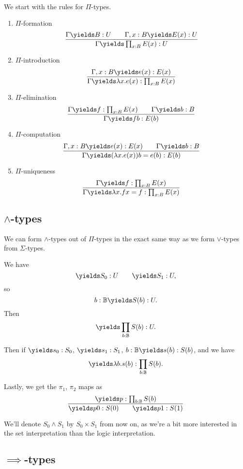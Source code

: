 \documentclass{article}
\newcommand\BB{\mathbb{B}}
\begin{document}
We start with the rules for $\Pi$-types.
\begin{enumerate}
    \item $\Pi$-formation 
        \[ \frac{
            \Gamma \yields B: U
            \qquad \Gamma,x:B\yields E(x):U
        }{
            \Gamma \yields \prod_{x:B} E(x) : U
        }\]
    \item $\Pi$-introduction
        \[\frac{\Gamma,x:B\yields e(x) :E(x)}{
            \Gamma \yields \lambda x.e(x) : \prod_{x:B} E(x)
        }\]
    \item $\Pi$-elimination
        \[
            \frac{\Gamma \yields f:\prod_{x:B}E(x)
            \qquad
            \Gamma \yields b:B
            }{
                \Gamma \yields fb:E(b)
            }
        \]
    \item $\Pi$-computation
        \[
            \frac{
                \Gamma, x:B\yields e(x):E(x) 
                \qquad
                \Gamma \yields b:B
            }
            {
                \Gamma \yields 
                    (\lambda x. e(x))b = e(b) : E(b)
            }
        \]
    \item $\Pi$-uniqueness
        \[ 
            \frac{
                \Gamma \yields f:\prod_{x:B}E(x)
            }{
                \Gamma \yields \lambda x.fx = f : \prod_{x:B}E(x)
            }
        \]
\end{enumerate}

\subsection{$\wedge$-types}

We can form $\wedge$-types out of $\Pi$-types in the exact same 
way as we form $\vee$-types from $\Sigma$-types.

We have 
\[\yields S_0:U\qquad \yields S_1:U, \]
so 
\[b:\BB \yields S(b) :U.\]
Then 
\[\yields \prod_{b:\BB} S(b):U. \]

Then if $\yields s_0:S_0$, $\yields s_1:S_1$, 
$b:\BB \yields s(b):S(b)$, and we have 
\[\yields \lambda b.s(b) : \prod_{b:\BB} S(b).\]

Lastly, we get the $\pi_1$, $\pi_2$ maps as 
\[\frac{\yields p:\prod_{b:\BB} S(b)}{\yields p0:S(0)\qquad \yields p1:S(1)}\]

We'll denote $S_0\wedge S_1$ by $S_0\times S_1$ from now on,
as we're a bit more interested in the set interpretation than
the logic interpretation.

\subsection{$\implies$-types}
\end{document}
